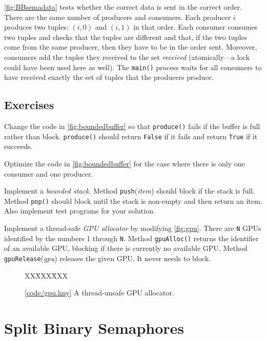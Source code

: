 \documentclass{report}
\newcommand{\harmonysource}[1]{
\begin{tabbing}
XX\=XXX\=XXX\kill
    
\end{tabbing}
}
\newcommand{\harmonylink}[1]{%
[\href{https://www.cs.cornell.edu/home/rvr/harmony/#1}{\underline{#1}}]%
}
\newenvironment{code}{
\tcolorbox
}{
\endtcolorbox
}
\begin{document}
\autoref{fig:BBsemadata} tests whether the correct data is sent in
the correct order.  There are the same number of producers and consumers.
Each producer $i$ produces two tuples: $(i, 0)$ and $(i, 1)$ in that order.
Each consumer consumes two tuples and checks that the tuples are different
and that, if the two tuples come from the same producer, then they have to
be in the order sent.
Moreover, consumers add the tuples they received to the set
\textit{received} (atomically---a lock could have been used here as well).
The \texttt{main()} process waits for all consumers to have received
exactly the set of tuples that the producers produce.

\section*{Exercises}
\begin{problems}
\item \label{ex:nbproduce} Change the code in \autoref{fig:boundedbuffer} so that
\texttt{produce()} fails if the buffer is full rather than block.
\texttt{produce()} should return \texttt{False} if it fails
and return \texttt{True} if it succeeds.
\item Optimize the code in \autoref{fig:boundedbuffer} for the case
where there is only one consumer and one producer.
\item Implement a \emph{bounded stack}.  Method \texttt{push}(\textit{item})
should block if the stack is full.  Method \texttt{pop()} should block
until the stack is non-empty and then return an item.
Also implement test programs for your solution.
\item \label{ex:gpu} Implement a thread-safe \emph{GPU allocator} by modifying
\autoref{fig:gpu}.
There are \texttt{N} GPUs identified by the numbers
1 through \texttt{N}.  Method \texttt{gpuAlloc()} returns the identifier
of an available GPU, blocking if there is currently no available GPU.
Method \texttt{gpuRelease}(\textit{gpu}) releases the given GPU.  It never needs
to block.
\end{problems}

\begin{figure}
\begin{code}
\harmonysource{gpu}
\end{code}
\caption{\harmonylink{code/gpu.hny} A thread-unsafe GPU allocator.}
\label{fig:gpu}
\end{figure}

\chapter{Split Binary Semaphores}
\label{ch:sbs}
%
\end{document}
